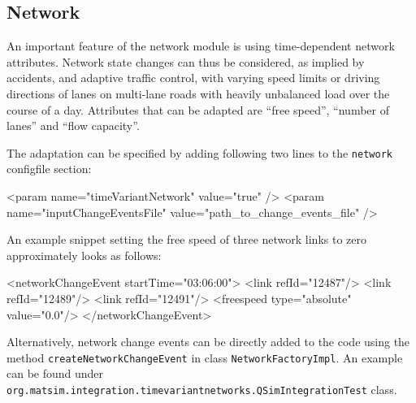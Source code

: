 
\subsection{Network}
\label{sec:extending-network}
An important feature of the network module is using time-dependent network attributes. Network state changes can thus be considered, as \eg implied by accidents, and adaptive traffic control, with varying speed limits or driving directions of lanes on multi-lane roads with heavily unbalanced load over the course of a day. Attributes that can be adapted are ``free speed'', ``number of lanes'' and ``flow capacity''.

The adaptation can be specified by adding following two lines to the \lstinline|network| \gls{configfile} section:
\begin{xml}
<param name="timeVariantNetwork" value="true" />
<param name="inputChangeEventsFile" value="path_to_change_events_file" />
\end{xml}
%
An example snippet setting the free speed of three network links to zero approximately looks as follows:
%
\begin{xml}
  <networkChangeEvent startTime="03:06:00">
    <link refId="12487"/>
    <link refId="12489"/>
    <link refId="12491"/>
    <freespeed type="absolute" value="0.0"/>
  </networkChangeEvent>
\end{xml}
%

Alternatively, network change events can be directly added to the code using the method \lstinline|createNetworkChangeEvent| in class \lstinline|NetworkFactoryImpl|. An example can be found under \lstinline|org.matsim.integration.timevariantnetworks.QSimIntegrationTest| class. %
%
%

